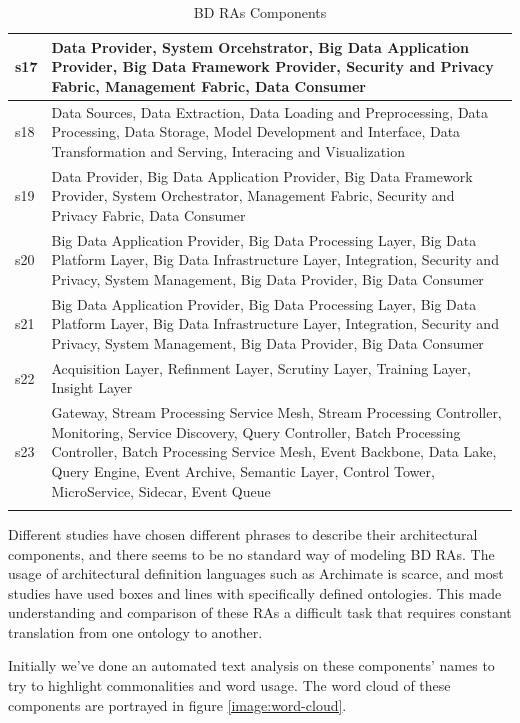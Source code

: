 \documentclass[review]{elsarticle}
\begin{document}
\begin{longtable}{|p{0.5cm}|p{10cm}|}
        \hline
        s17 & Data Provider, System Orcehstrator, Big Data Application Provider, Big Data Framework Provider, Security and Privacy Fabric, Management Fabric, Data Consumer \\
        \hline
        s18 & Data Sources, Data Extraction, Data Loading and Preprocessing, Data Processing, Data Storage, Model Development and Interface, Data Transformation and Serving, Interacing and Visualization \\
        \hline
        s19 & Data Provider, Big Data Application Provider, Big Data Framework Provider, System Orchestrator, Management Fabric, Security and Privacy Fabric, Data Consumer \\
        \hline
        s20 & Big Data Application Provider, Big Data Processing Layer, Big Data Platform Layer, Big Data Infrastructure Layer, Integration, Security and Privacy, System Management, Big Data Provider, Big Data Consumer \\
        \hline
        s21 & Big Data Application Provider, Big Data Processing Layer, Big Data Platform Layer, Big Data Infrastructure Layer, Integration, Security and Privacy, System Management, Big Data Provider, Big Data Consumer \\
        \hline
        s22 & Acquisition Layer, Refinment Layer, Scrutiny Layer, Training Layer, Insight Layer \\
        \hline
        s23 & Gateway, Stream Processing Service Mesh, Stream Processing Controller, Monitoring, Service Discovery, Query Controller, Batch Processing Controller, Batch Processing Service Mesh, Event Backbone, Data Lake, Query Engine, Event Archive, Semantic Layer, Control Tower, MicroService, Sidecar, Event Queue  \\
        \hline
        \caption{BD RAs Components}
        \label{Table:BD-RAs-Components}
\end{longtable}

Different studies have chosen different phrases to describe their architectural components, and there seems to be no standard way of modeling BD RAs. The usage of architectural definition languages such as Archimate is scarce, and most studies have used boxes and lines with specifically defined ontologies. This made understanding and comparison of these RAs a difficult task that requires constant translation from one ontology to another. 

Initially we've done an automated text analysis on these components' names to try to highlight commonalities and word usage. The word cloud of these components are portrayed in figure \ref{image:word-cloud}.
\end{document}
